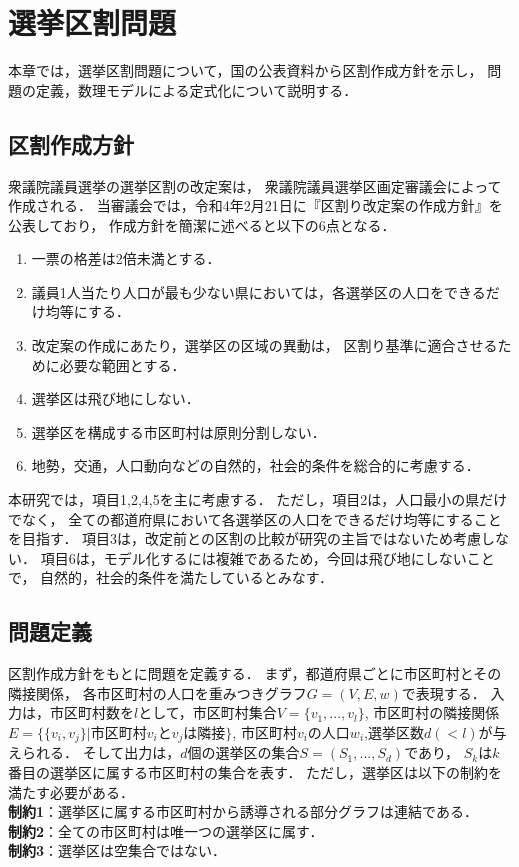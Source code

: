 \chapter{選挙区割問題} \label{chapter:2}

本章では，選挙区割問題について，国の公表資料から区割作成方針を示し，
問題の定義，数理モデルによる定式化について説明する．

\section{区割作成方針}
衆議院議員選挙の選挙区割の改定案は，
衆議院議員選挙区画定審議会によって作成される．
当審議会では，令和4年2月21日に『区割り改定案の作成方針』を公表しており，
作成方針を簡潔に述べると以下の6点となる．
\begin{enumerate}
    \item 一票の格差は2倍未満とする．
    \item 議員1人当たり人口が最も少ない県においては，各選挙区の人口をできるだけ均等にする．
    \item 改定案の作成にあたり，選挙区の区域の異動は，
    区割り基準に適合させるために必要な範囲とする．
    \item 選挙区は飛び地にしない．
    \item 選挙区を構成する市区町村は原則分割しない．
    \item 地勢，交通，人口動向などの自然的，社会的条件を総合的に考慮する．
\end{enumerate}

本研究では，項目1,2,4,5を主に考慮する．
ただし，項目2は，人口最小の県だけでなく，
全ての都道府県において各選挙区の人口をできるだけ均等にすることを目指す．
項目3は，改定前との区割の比較が研究の主旨ではないため考慮しない．
項目6は，モデル化するには複雑であるため，今回は飛び地にしないことで，
自然的，社会的条件を満たしているとみなす．

\section{問題定義}

区割作成方針をもとに問題を定義する．
まず，都道府県ごとに市区町村とその隣接関係，
各市区町村の人口を重みつきグラフ$G=(V, E, w)$で表現する．
入力は，市区町村数を$l$として，市区町村集合$V=\{v_1,...,v_l\}$, 
市区町村の隣接関係$E=\{\{v_i,v_j\}|$市区町村$v_i$と$v_j$は隣接$\}$, 
市区町村$v_i$の人口$w_i$,選挙区数$d(<l)$が与えられる．
そして出力は，$d$個の選挙区の集合$S=(S_1,...,S_d)$であり，
$S_k$は$k$番目の選挙区に属する市区町村の集合を表す．
ただし，選挙区は以下の制約を満たす必要がある．\\
\quad\textbf{制約1}：選挙区に属する市区町村から誘導される部分グラフは連結である．\\
\quad\textbf{制約2}：全ての市区町村は唯一つの選挙区に属す．\\
\quad\textbf{制約3}：選挙区は空集合ではない．

